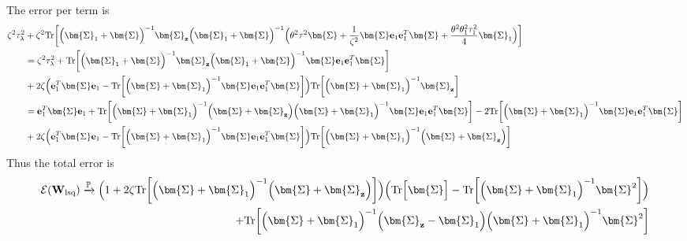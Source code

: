 \documentclass[final]{l4dc2026}
\newcommand{\bSigma}{\bm{\Sigma}}
\newcommand{\bW}{\mathbf{W}}
\newcommand{\be}{\mathbf{e}}
\newcommand{\bz}{\mathbf{z}}
\newcommand{\bbP}{\mathbb{P}}
\newcommand{\calE}{\mathcal{E}}
\newcommand{\bzero}{\mathbf{0}}
\newcommand{\tr}{\text{Tr}}
\newcommand{\rarrowp}{\xrightarrow[]{\bbP}}
\begin{document}
The error per term is
\begin{align*}
    \zeta^2 \tau_{\lambda}^2 &+ \zeta^2 \tr\biggl[  \Bigl( \bSigma_1 + \bSigma \Bigr)^{-1} \bSigma_{\bz}  \Bigl(  \bSigma_1 + \bSigma \Bigr)^{-1} \Bigl( \theta^2 \tau^2 \bSigma + \frac{1}{\zeta^2}  \bSigma \be_1 \be_1^T \bSigma + \frac{\theta^2 \theta^2_1 \tau^2_1 }{4} \bSigma_1 \Bigr) \biggr] \\ 
    &= \zeta^2 \tau_{\lambda}^2 +  \tr \biggl[ \Bigl( \bSigma_1 + \bSigma \Bigr)^{-1} \bSigma_{\bz}  \Bigl(  \bSigma_1 + \bSigma \Bigr)^{-1}  \bSigma \be_1 \be_1^T \bSigma \biggr] \\
    &+  2\zeta  \Bigl(\be_1^T \bSigma \be_1 - \tr\biggl[ \Bigl(\bSigma + \bSigma_1\Bigr)^{-1} \bSigma \be_1 \be_1^T \bSigma  \biggr]\Bigr) \tr \biggl[\Bigl(\bSigma + \bSigma_1 \Bigr)^{-1} \bSigma_{\bz}\biggr] \\ 
    &= \be_1^T \bSigma \be_1 +\tr \biggl[ \Bigl(\bSigma + \bSigma_1 \Bigr)^{-1} \Bigl(\bSigma + \bSigma_{\bz}\Bigr) \Bigl(\bSigma + \bSigma_1 \Bigr)^{-1} \bSigma \be_1 \be_1^T \bSigma\biggr]- 2  \tr\biggl[\Bigl(\bSigma + \bSigma_1\Bigr)^{-1}  \bSigma \be_1 \be_1^T \bSigma\biggr]\\
    &+ 2\zeta  \Bigl(\be_1^T \bSigma \be_1 - \tr \biggl[\Bigl(\bSigma + \bSigma_1\Bigr)^{-1} \bSigma \be_1 \be_1^T \bSigma\biggr]  \Bigr) \tr \biggl[\Bigl(\bSigma + \bSigma_1 \Bigr)^{-1} \Bigl(\bSigma + \bSigma_{\bz}\Bigr) \biggr]
\end{align*}
Thus the total error is
\begin{align*}
    \calE(\bW_{\text{lsq}}) \rarrowp \Bigl(1 + 2\zeta \tr\biggl[ \Bigl(\bSigma + \bSigma_1 \Bigr)^{-1} \Bigl(\bSigma + \bSigma_{\bz}\Bigr) \biggr] \Bigr) \Bigl( \tr\Bigl[ \bSigma \Bigr]- \tr \biggl[ \Bigl(\bSigma + \bSigma_1\Bigr)^{-1} \bSigma^2 \biggr]\Bigr) \\
    + \tr \biggl[ \Bigl(\bSigma + \bSigma_1 \Bigr)^{-1} \Bigl(\bSigma_{\bz} - \bSigma_1\Bigr) \Bigl(\bSigma + \bSigma_1 \Bigr)^{-1} \bSigma^2 \biggr]
\end{align*}
\end{document}
